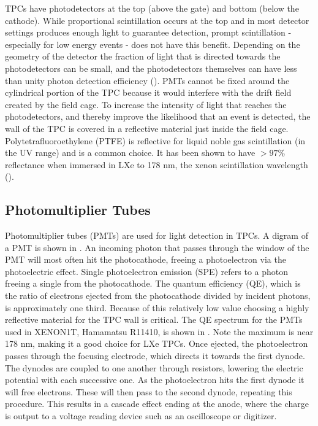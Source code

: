 TPCs have photodetectors at the top (above the gate) and bottom (below the cathode).  While proportional scintillation occurs at the top
and in most detector settings produces enough light to guarantee detection, prompt scintillation - especially for low energy events - does
not have this benefit.  Depending on the geometry of the detector the fraction of light that is directed towards the photodetectors can
be small, and the photodetectors themselves can have less than unity photon detection efficiency ().  PMTs cannot
be fixed around the cylindrical portion of the TPC because it would interfere with the drift field created by the field cage.  To increase
the intensity of light that reaches the photodetectors, and thereby improve the likelihood that an event is
detected, the wall of the TPC is covered in a reflective material just inside the field cage.  Polytetrafluoroethylene (PTFE) is
reflective for liquid noble gas scintillation (in the UV range) and is a common choice.  It has been shown to have $> 97 \%$
reflectance when immersed in LXe to 178 nm, the xenon scintillation wavelength ().


\subsection{Photomultiplier Tubes}
\label{subsec:tpcs_pmts}
Photomultiplier tubes (PMTs) are used for light detection in TPCs.  A digram of a PMT is shown in .  An
incoming photon that
passes through the window of the PMT will most often hit the photocathode, freeing a photoelectron via the photoelectric effect.  Single
photoelectron emission (SPE) refers to a photon freeing a single \electron from the photocathode.  The
quantum efficiency (QE), which is the ratio of electrons ejected from the photocathode divided by incident photons, is approximately
one third.  Because of this relatively low value choosing a highly reflective material for the TPC wall is critical.  The QE spectrum for
the PMTs used in XENON1T, Hamamatsu R11410, is shown in .  Note the maximum is near 178 nm, making it a good
choice for LXe TPCs.  Once ejected, the photoelectron passes through the focusing
electrode, which directs it towards the first dynode.  The dynodes are coupled to one another through resistors, lowering the electric
potential with each successive one.  As the photoelectron hits the first dynode it will free electrons.  These will then pass to the
second dynode, repeating this procedure.  This results in a cascade effect ending at the anode, where the charge is output to a
voltage reading device such as an oscilloscope or digitizer.


